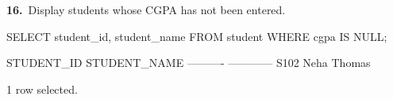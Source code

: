 \noindent\begin{minipage}{\linewidth}
\begingroup{}
{\fontsize{14}{17}\selectfont\textbf{16.}}\ Display students whose CGPA has not been entered.\par
\endgroup\vspace{12pt}


\begin{sqlcode}
SELECT student_id, student_name
FROM student WHERE cgpa IS NULL;
\end{sqlcode}

\vspace{18pt}


\begin{sqlout}[fontsize=\small]
STUDENT_ID  STUDENT_NAME
----------  ------------
S102        Neha Thomas

1 row selected.
\end{sqlout}
\end{minipage}\par\vspace{24pt}

